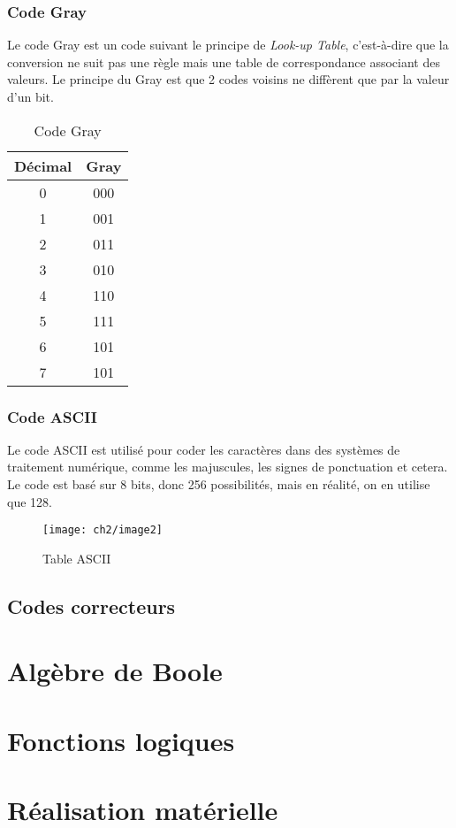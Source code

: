 \subsubsection{Code Gray}
Le code Gray est un code suivant le principe de \textit{Look-up Table}, c'est-à-dire que la conversion ne suit pas une règle mais une table de correspondance associant des valeurs. Le principe du Gray est que 2 codes voisins ne diffèrent que par la valeur d'un bit.
\begin{table}[H]
	\centering
	\begin{tabular}{c|c}
		Décimal & Gray \\
		\hline
		0 & 000\\
		 \hline
		1 & 001\\
		 \hline
		2 & 011\\
		 \hline
		3 & 010\\
		 \hline
		4 & 110\\
		 \hline
		5 & 111\\
		 \hline
		6 & 101\\
		 \hline
		7 & 101		 
	\end{tabular}
	\caption{Code Gray}
\end{table}
\subsubsection{Code ASCII}
Le code ASCII est utilisé pour coder les caractères dans des systèmes de traitement numérique, comme les majuscules, les signes de ponctuation et cetera. Le code est basé sur 8 bits, donc 256 possibilités, mais en réalité, on en utilise que 128.
\begin{figure}[H]
	\centering
	\texttt{[image: ch2/image2]}
	\caption{Table ASCII}
\end{figure}
\subsection{Codes correcteurs}

\section{Algèbre de Boole}

\section{Fonctions logiques}

\section{Réalisation matérielle}

